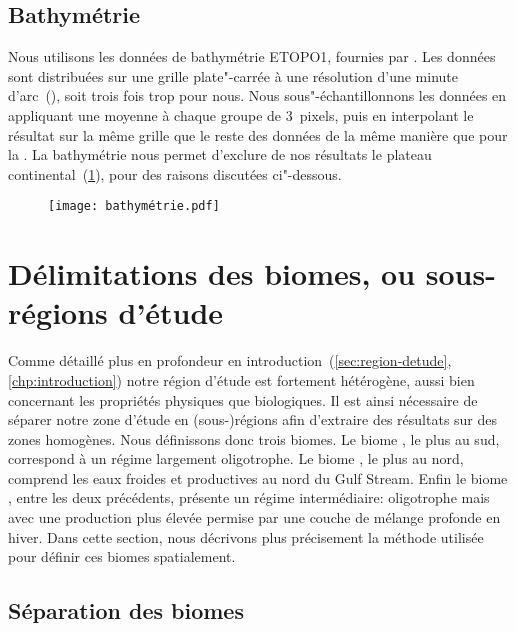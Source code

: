 \subsection{Bathymétrie}
\label{sec:donnees-bathymetrie}

Nous utilisons les données de bathymétrie ETOPO1, fournies par .
Les données sont distribuées sur une grille plate"-carrée à une résolution d'une minute d'arc~(), soit trois fois trop pour nous.
Nous sous"-échantillonnons les données en appliquant une moyenne à chaque groupe de 3~pixels, puis en interpolant le résultat sur la même grille que le reste des données de la même manière que pour la .
La bathymétrie nous permet d'exclure de nos résultats le plateau continental~(\cref{fig:bathymetrie}), pour des raisons discutées ci"-dessous.

\begin{figure}
  \centering
  \texttt{[image: bathymétrie.pdf]}
  \label{fig:bathymetrie}
\end{figure}

\section{Délimitations des biomes, ou sous-régions d'étude}
\label{sec:delimitations-regions}

Comme détaillé plus en profondeur en introduction~(\cref{sec:region-detude}, \cref*{chp:introduction}) notre région d'étude est fortement hétérogène, aussi bien concernant les propriétés physiques que biologiques.
Il est ainsi nécessaire de séparer notre zone d'étude en (sous-)régions afin d'extraire des résultats sur des zones homogènes.
Nous définissons donc trois biomes.
Le biome , le plus au sud, correspond à un régime largement oligotrophe.
Le biome , le plus au nord, comprend les eaux froides et productives au nord du Gulf Stream.
Enfin le biome , entre les deux précédents, présente un régime intermédiaire: oligotrophe mais avec une production plus élevée permise par une couche de mélange profonde en hiver.
Dans cette section, nous décrivons plus précisement la méthode utilisée pour définir ces biomes spatialement.

\subsection{Séparation des biomes}

